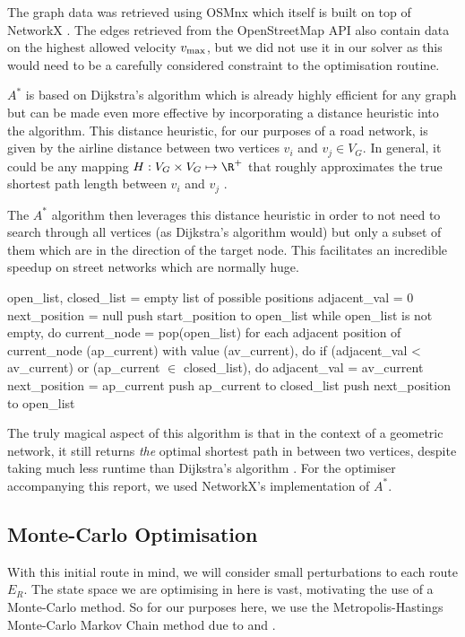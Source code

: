 \documentclass{prettytex/ox/mmsc-special-topic}
\begin{document}
  The graph data was retrieved using OSMnx \parencite{osmnx} which itself is built on top of NetworkX \parencite{networkx}. The edges retrieved from the OpenStreetMap API also contain data on the highest allowed velocity $v_{\rm max}$, but we did not use it in our solver as this would need to be a carefully considered constraint to the optimisation routine.

  $A^*$ is based on Dijkstra's algorithm which is already highly efficient for any graph but can be made even more effective by incorporating a distance heuristic into the algorithm.
  This distance heuristic, for our purposes of a road network, is given by the airline distance between two vertices $v_i$ and $v_j \in V_G$.
  In general, it could be any mapping $H: V_G \times V_G \mapsto \R^+$ that roughly approximates the true shortest path length between $v_i$ and $v_j$ \parencite{astar}.

  The $A^*$ algorithm then leverages this distance heuristic in order to not need to search through all vertices (as Dijkstra's algorithm would) but only a subset of them which are in the direction of the target node.
  This facilitates an incredible speedup on street networks which are normally huge.

  \begin{algorithm}[language=pseudo,basicstyle=\footnotesize,caption={\centering The $A^*$-search algorithm \parencite{astar}}]
open_list, closed_list = empty list of possible positions
adjacent_val = 0
next_position = null
push start_position to open_list
while open_list is not empty, do
  current_node = pop(open_list)
  for each adjacent position of current_node (ap_current)
        with value (av_current), do
    if (adjacent_val < av_current) or (ap_current $\in$ closed_list), do
      adjacent_val = av_current
      next_position = ap_current
    push ap_current to closed_list
  push next_position to open_list
  \end{algorithm}

  The truly magical aspect of this algorithm is that in the context of a geometric network, it still returns \textit{the} optimal shortest path in between two vertices, despite taking much less runtime than Dijkstra's algorithm \parencite{astar}.
  For the optimiser accompanying this report, we used NetworkX's implementation of $A^*$.

  \subsection{Monte-Carlo Optimisation}
  With this initial route in mind, we will consider small perturbations to each route $E_R$.
  The state space we are optimising in here is vast, motivating the use of a Monte-Carlo method.
  So for our purposes here, we use the Metropolis-Hastings Monte-Carlo Markov Chain method due to \cite{metropolis} and \cite{hastings}.
\end{document}
